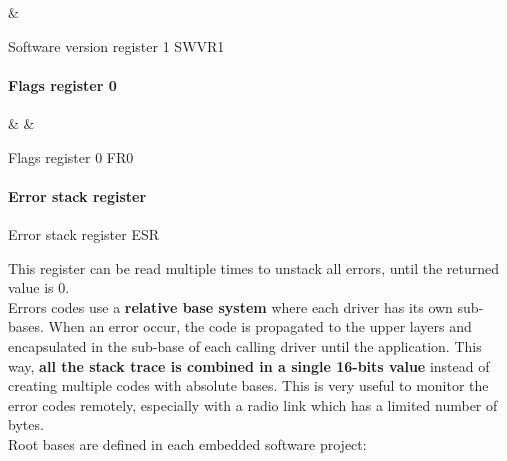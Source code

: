 \rmt
{ & }
{}

{Software version register 1}
{SWVR1}

\paragraph{Flags register 0}

\rmt
{}
{ &  & }

{Flags register 0}
{FR0}

\newpage

\paragraph{Error stack register} \label{error-stack-register}

\rmt
{}
{}

{Error stack register}
{ESR}

\medskip
This register can be read multiple times to unstack all errors, until the returned value is 0.
\medskip \\
Errors codes use a \textbf{relative base system} where each driver has its own sub-bases. When an error occur, the code is propagated to the upper layers and encapsulated in the sub-base of each calling driver until the application. This way, \textbf{all the stack trace is combined in a single 16-bits value} instead of creating multiple codes with absolute bases. This is very useful to monitor the error codes remotely, especially with a radio link which has a limited number of bytes.
\medskip \\
Root bases are defined in each embedded software project:



